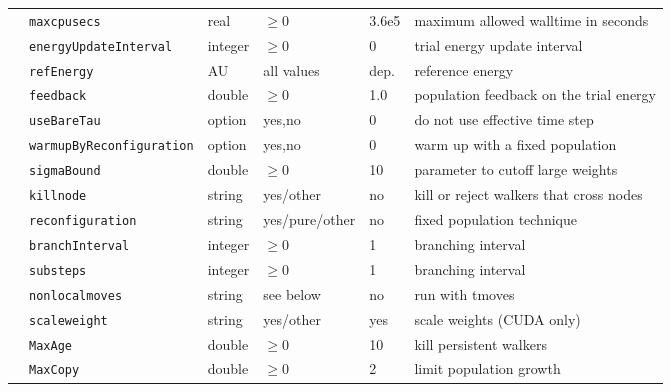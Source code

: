 \begin{table}[h]
\begin{center}
\begin{tabularx}{\textwidth}{l l l l l l }
   &   \texttt{maxcpusecs          } &  real  & $\ge 0$ & 3.6e5   & maximum allowed walltime in seconds \\
   &   \texttt{energyUpdateInterval} &  integer  & $\ge 0$ & 0   & trial energy update interval \\
   &   \texttt{refEnergy           } &  AU  & all values & dep.   & reference energy  \\
   &   \texttt{feedback            } &  double  & $\ge 0$ & 1.0   & population feedback on the trial energy \\
   &   \texttt{useBareTau          } &  option  & yes,no & 0   & do not use effective time step  \\
   &   \texttt{warmupByReconfiguration} &  option  & yes,no & 0   & warm up with a fixed population  \\
   &   \texttt{sigmaBound          } &  double  & $\ge 0$  & 10   & parameter to cutoff large weights  \\
   &   \texttt{killnode            } &  string  & yes/other & no   & kill or reject walkers that cross nodes  \\
   &   \texttt{reconfiguration     } &  string  & yes/pure/other & no   & fixed population technique  \\
   &   \texttt{branchInterval      } &  integer  & $\ge 0$ & 1   & branching interval \\
   &   \texttt{substeps            } &  integer  & $\ge 0$ & 1   & branching interval \\
   &   \texttt{nonlocalmoves       } &  string  & see below & no   & run with tmoves  \\
   &   \texttt{scaleweight         } &  string  & yes/other & yes   & scale weights (CUDA only)  \\
   &   \texttt{MaxAge              } &  double  & $\ge 0$ & 10   & kill persistent walkers  \\
    &   \texttt{MaxCopy             } &  double  & $\ge 0$ &2   & limit population growth \\

\end{tabularx}
\end{center}
\end{table}
